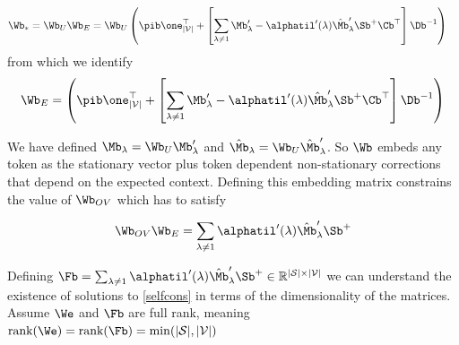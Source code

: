 \documentclass{article}
\begin{document}
\begin{align}
    \Wb_* = \Wb_U \Wb_E &= \Wb_U \left (\pib \one_{|\mathcal{V}|}^\top + \left[ \sum_{\lambda \neq 1} \Mb'_\lambda - \alphatil'(\lambda) \hat{\Mb}'_\lambda \Sb^+\Cb^\top\right ]  \Db^{-1}\right)
\end{align}
from which we identify 
\begin{align}
    \Wb_E = \left (\pib \one_{|\mathcal{V}|}^\top + \left[ \sum_{\lambda \neq 1} \Mb'_\lambda - \alphatil'(\lambda) \hat{\Mb}'_\lambda \Sb^{+}\Cb^\top\right ]  \Db^{-1}\right)
\end{align}

We have defined $\Mb_\lambda = \Wb_U \Mb_\lambda'$ and $\hat{\Mb}_\lambda = \Wb_U \hat{\Mb}_\lambda'$. So $\Wb$ embeds any token as the stationary vector plus token dependent non-stationary corrections that depend on the expected context. Defining this embedding matrix constrains the value of $\Wb_{OV}$ which has to satisfy 


\begin{equation}\label{selfcons}
   \Wb_{OV}\Wb_E = \sum_{\lambda\neq 1} \alphatil'(\lambda) \hat{\Mb}'_\lambda \Sb^+
\end{equation}



Defining $\Fb = \sum_{\lambda\neq 1} \alphatil'(\lambda) \hat{\Mb}'_\lambda \Sb^+ \in \mathbb{R}^{|\mathcal{S}|\times |\mathcal{V}|}$ we can understand the existence of solutions to \eqref{selfcons} in terms of the dimensionality of the matrices. Assume $\We$ and $\Fb$ are full rank, meaning $\textrm{rank}(\We) = \textrm{rank}(\Fb) = \min(|\mathcal{S}|,|\mathcal{V}|)$
\end{document}
